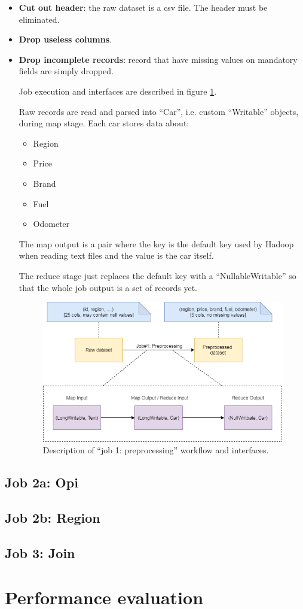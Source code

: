 \begin{itemize}

  \item \textbf{Cut out header}: the raw dataset is a csv file. The header must be eliminated.
  \item \textbf{Drop useless columns}.
  \item \textbf{Drop incomplete records}: record that have missing values on mandatory fields are simply dropped. 

Job execution and interfaces are described in figure \ref{fig:MR-job-1}.
 
Raw records are read and parsed into ``Car'', i.e. custom ``Writable'' objects, during map stage. 
Each car stores data about:
\begin{itemize}
 \item Region
 \item Price
 \item Brand
 \item Fuel
 \item Odometer
\end{itemize}

The map output is a pair where the key is the default key used by Hadoop when reading text files and the value is the car itself.

The reduce stage just replaces the default key with a ``NullableWritable'' so that the whole job output is a set of records yet.

\begin{figure}[H]
	\centering
	\includegraphics[scale=0.7]{images/2-mapreduce/MR-job-1.png}
	\caption{Description of ``job 1: preprocessing'' workflow and interfaces.}
	\label{fig:MR-job-1}
\end{figure}




\end{itemize}

\subsection{Job 2a: Opi}


\subsection{Job 2b: Region}


\subsection{Job 3: Join}


\section{Performance evaluation}
